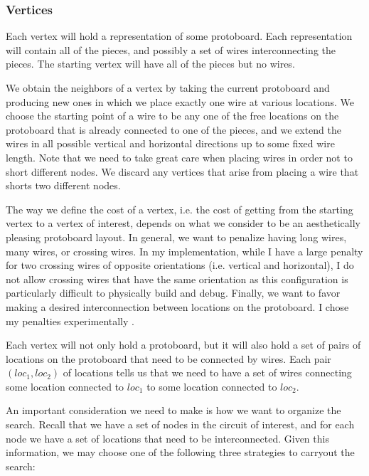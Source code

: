 \subsubsection{Vertices}

Each vertex will hold a representation of some protoboard. Each representation
will contain all of the pieces, and possibly a set of wires interconnecting the
pieces. The starting vertex will have all of the pieces but no wires.

We obtain the neighbors of a vertex by taking the current protoboard and
producing new ones in which we place exactly one wire at various locations. We
choose the starting point of a wire to be any one of the free locations on the
protoboard that is already connected to one of the pieces, and we extend the
wires in all possible vertical and horizontal directions up to some fixed wire
length. Note that we need
to take great care when placing wires in order not to short different nodes. We
discard any vertices that arise from placing a wire that shorts two different
nodes.

The way we define the cost of a vertex, i.e. the cost of getting from the
starting vertex to a vertex of interest, depends on what we consider to be an
aesthetically pleasing protoboard layout. In general, we want to penalize having
long wires, many wires, or crossing wires. In my implementation, while I have
a large penalty for two crossing wires of opposite orientations (i.e. vertical
and horizontal), I do not allow crossing wires that have the same orientation as
this configuration is particularly difficult to physically build and debug.
Finally, we want to favor making a desired interconnection between locations
on the protoboard. I chose my penalties experimentally
\q.

Each vertex will not only hold a protoboard, but it will also hold a set of
pairs of locations on the protoboard that need to be connected by wires. Each
pair $(loc_1, loc_2)$ of locations tells us that we need to have a set of wires
connecting some location connected to $loc_1$ to some location connected to
$loc_2$.

An important consideration we need to make is how we want to organize the
search. Recall that we have a set of nodes in the circuit of interest, and for
each node we have a set of locations that need to be interconnected. Given this
information, we may choose one of the following three strategies to carryout the
search:


